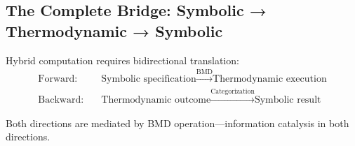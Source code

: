 \subsection{The Complete Bridge: Symbolic → Thermodynamic → Symbolic}

\begin{theorem}
\label{thm:bidirectional_bridge}
Hybrid computation requires bidirectional translation:
\begin{align}
\text{Forward:} \quad &\text{Symbolic specification} \xrightarrow{\text{BMD}} \text{Thermodynamic execution} \\
\text{Backward:} \quad &\text{Thermodynamic outcome} \xrightarrow{\text{Categorization}} \text{Symbolic result}
\end{align}

Both directions are mediated by BMD operation—information catalysis in both directions.
\end{theorem}

